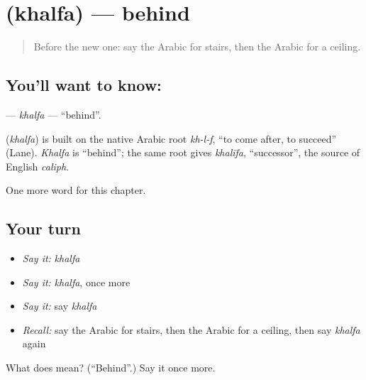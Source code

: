 \section[\texorpdfstring{\ar{خلف} (khalfa)}{خلف (khalfa)}]{ (khalfa) — behind}

\label{lesson:AR-C102-khalfa}



\begin{quote}
Before the new one: say the Arabic for stairs, then the Arabic for a ceiling.
\end{quote}

\subsection*{You'll want to know: }
\textbf{} — \emph{khalfa} — \textquotedblleft{}behind\textquotedblright{}.

\begin{cousinweb}
\textbf{} (\emph{khalfa}) is built on the native Arabic root \emph{kh-l-f}, \textquotedblleft{}to come after, to succeed\textquotedblright{} (Lane). \emph{Khalfa} is \textquotedblleft{}behind\textquotedblright{}; the same root gives \emph{khalīfa}, \textquotedblleft{}successor\textquotedblright{}, the source of English \emph{caliph}.
\end{cousinweb}

\begin{grammarlens}[title={What you've built}]
One more word for this chapter.
\end{grammarlens}

\subsection*{Your turn}
\begin{itemize}
\raggedright
  \item \emph{Say it:} \emph{khalfa}
  \item \emph{Say it:} \emph{khalfa}, once more
  \item \emph{Say it:} say \emph{khalfa}
  \item \emph{Recall:} say the Arabic for stairs, then the Arabic for a ceiling, then say \emph{khalfa} again
\end{itemize}

\begin{tcolorbox}[breakable,colback=teal!4,colframe=teal!35!black,title={Before you move on}]
What does  mean? (\textquotedblleft{}Behind\textquotedblright{}.) Say it once more.
\end{tcolorbox}
